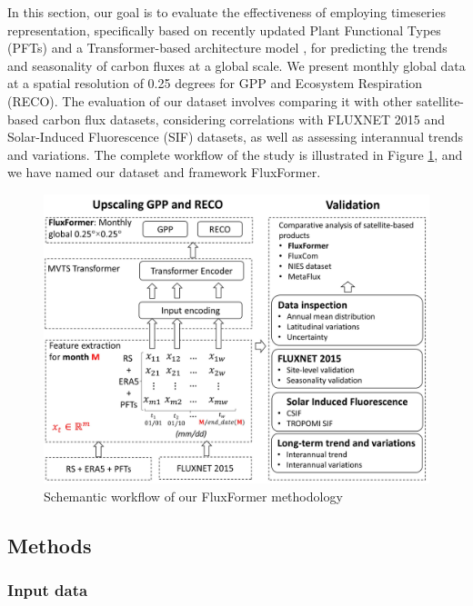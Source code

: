 In this section, our goal is to evaluate the effectiveness of employing timeseries representation, specifically based on recently updated Plant Functional Types (PFTs) \citep{harper202229} and a Transformer-based architecture model \citep{zerveas2021transformer}, for predicting the trends and seasonality of carbon fluxes at a global scale. We present monthly global data at a spatial resolution of 0.25 degrees for GPP and Ecosystem Respiration (RECO). The evaluation of our dataset involves comparing it with other satellite-based carbon flux datasets, considering correlations with FLUXNET 2015 and Solar-Induced Fluorescence (SIF) datasets, as well as assessing interannual trends and variations. The complete workflow of the study is illustrated in Figure \ref{fig:chap6_fig1}, and we have named our dataset and framework FluxFormer.

\begin{figure}[tbh!]
    \centering
    \includegraphics[width=\textwidth]{figs/chap6/workflow.jpg}
    \caption[Schemantic workflow of our FluxFormer methodology]{Schemantic workflow of our FluxFormer methodology}
    \label{fig:chap6_fig1}
\end{figure}

\subsection{Methods}
\subsubsection{Input data}

